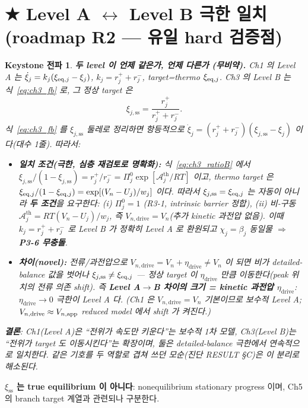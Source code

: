 \documentclass[11pt,a4paper]{article}
\newtheorem*{keybox}{Keystone 전파}
\newcommand{\drive}{\mathrm{drive}}\newcommand{\tot}{\mathrm{tot}}\newcommand{\bg}{\mathrm{bg}}
\begin{document}
\section{★ Level A $\leftrightarrow$ Level B 극한 일치 (roadmap R2 — 유일 hard 검증점)}\label{sec:reconcile}
\begin{keybox}
\textbf{두 level 이 언제 같은가, 언제 다른가 (무비약).}
Ch1 의 Level A 는 $\dot\xi_j=k_j(\xi_{\mathrm{eq},j}-\xi_j)$, $k_j=r_j^++r_j^-$, target=thermo $\xi_{\mathrm{eq},j}$.
Ch3 의 Level B 는 식~\eqref{eq:ch3_fb} 로, 그 \emph{정상 target} 은
\begin{equation}
\xi_{j,\mathrm{ss}}=\frac{r_j^+}{r_j^++r_j^-}.
\label{eq:ch3_xiss}
\end{equation}
식~\eqref{eq:ch3_fb} 를 $\xi_{j,\mathrm{ss}}$ 둘레로 정리하면 항등적으로
$\dot\xi_j=(r_j^++r_j^-)(\xi_{j,\mathrm{ss}}-\xi_j)$ 이다(대수 1줄). 따라서:
\begin{itemize}[leftmargin=1.4em]
\item \textbf{일치 조건(극한, 심층 재검토로 명확화):} 식~\eqref{eq:ch3_ratioB} 에서
  $\xi_{j,\mathrm{ss}}/(1-\xi_{j,\mathrm{ss}})=r_j^+/r_j^-=\Pi_j^0\exp[\mathcal A_j^{\mathrm{th}}/RT]$ 이고,
  thermo target 은 $\xi_{\mathrm{eq},j}/(1-\xi_{\mathrm{eq},j})=\exp[(V_n-U_j)/w_j]$ 이다. 따라서
  $\xi_{j,\mathrm{ss}}=\xi_{\mathrm{eq},j}$ 는 \emph{자동}이 아니라 \textbf{두 조건}을 요구한다: (i) $\Pi_j^0=1$
  (R3-1, intrinsic barrier 정합), (ii) 비-구동 $\mathcal A_j^{\mathrm{th}}=RT(V_n-U_j)/w_j$, 즉
  \textbf{$V_{n,\drive}=V_n$}(추가 kinetic 과전압 없음). 이때 $k_j=r_j^++r_j^-$ 로 Level B 가 \emph{정확히}
  Level A 로 환원되고 $\chi_j=\beta_j$ 동일물 $\Rightarrow$ \textbf{P3-6 무충돌}.
\item \textbf{차이(novel):} 전류/과전압으로 $V_{n,\drive}=V_n+\eta_{\drive}\ne V_n$ 이 되면 비가
  detailed-balance 값을 벗어나 $\xi_{j,\mathrm{ss}}\ne\xi_{\mathrm{eq},j}$ — 정상 target 이 $\eta_{\drive}$ 만큼
  \emph{이동}한다(peak 위치의 전류 의존 shift). 즉 \textbf{Level A$\to$B 차이의 크기 = kinetic 과전압
  $\eta_{\drive}$}: $\eta_{\drive}\to0$ 극한이 Level A 다. (Ch1 은 $V_{n,\drive}=V_n$ 기본이므로 보수적
  Level A; $V_{n,\drive}\approx V_{n,\app}$ reduced model 에서 shift 가 켜진다.)
\end{itemize}
\textbf{결론}: Ch1(Level A)은 ``전위가 속도만 키운다''는 \emph{보수적 1차} 모델, Ch3(Level B)는
``전위가 target 도 이동시킨다''는 \emph{확장}이며, 둘은 detailed-balance 극한에서 연속적으로 일치한다.
같은 기호를 두 역할로 겹쳐 쓰던 모순(진단 RESULT \S C)은 이 분리로 해소된다.
\end{keybox}
\textbf{$\xi_{\mathrm{ss}}$ 는 true equilibrium 이 아니다}: nonequilibrium stationary progress 이며,
Ch5 의 branch target 계열과 관련되나 구분한다.
\end{document}
